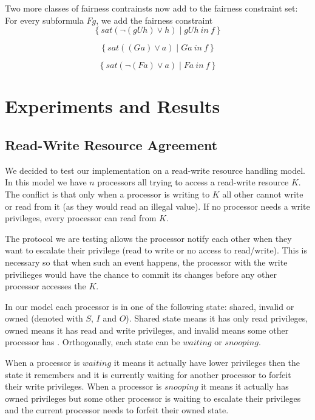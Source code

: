 \documentclass[11pt]{article}
\begin{document}
    Two more classes of fairness contrainsts now add to the fairness constraint set:
    For every subformula $Fg$, we add the fairness constraint
    \[
        \left\{sat(\neg(gUh)\vee h) \;|\; gUh\ in\ f \right\}
    \]

    \[
        \left\{sat((Ga)\vee a) \;|\; Ga\ in\ f \right\}
    \]

    \[        
        \left\{sat(\neg(Fa)\vee a) \;|\; Fa\ in\ f \right\}
    \]


\section{Experiments and Results}
    \subsection{Read-Write Resource Agreement}
        We decided to test our implementation on a read-write resource handling model. In
        this model we have $n$ processors all trying to access a read-write resource $K$. The
        conflict is that only when a processor is writing to $K$ all other cannot write or read
        from it (as they would read an illegal value). If no processor needs a write privileges, 
        every processor can read from $K$.

        The protocol we are testing allows the processor notify each other when they want to escalate
        their privilege (read to write or no access to read/write). This is necessary so that when such
        an event happens, the processor with the write privilieges would have the chance to commit its 
        changes before any other processor accesses the $K$.

        In our model each processor is in one of the following state: shared, invalid or owned 
        (denoted with $S$, $I$ and $O$). Shared state means it has only read privileges, owned 
        means it has read and write privileges, and invalid means some other processor has . Orthogonally, 
        each state can be $waiting$ or $snooping$.

        When a processor is $waiting$ it means it actually have lower privileges then the state it remembers 
        and it is currently waiting for another processor to forfeit their write privileges. When a
        processor is $snooping$ it means it actually has owned privileges but some other processor is waiting 
        to escalate their privileges and the current processor needs to forfeit their owned state.
\end{document}
